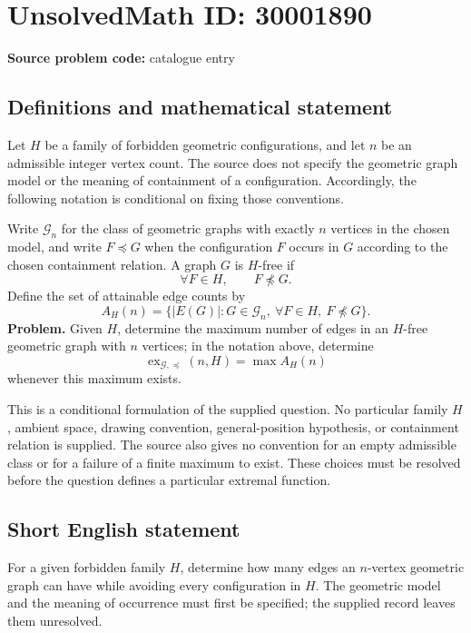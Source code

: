 \documentclass[11pt]{article}
\begin{document}
\section*{UnsolvedMath ID: 30001890}
\textbf{Source problem code:} catalogue entry
\subsection{Definitions and mathematical statement}
Let \(H\) be a family of forbidden geometric configurations, and let \(n\) be an admissible integer vertex count. The source does not specify the geometric graph model or the meaning of containment of a configuration. Accordingly, the following notation is conditional on fixing those conventions.

Write \(\mathcal G_n\) for the class of geometric graphs with exactly \(n\) vertices in the chosen model, and write \(F\preccurlyeq G\) when the configuration \(F\) occurs in \(G\) according to the chosen containment relation. A graph \(G\) is \(H\)-free if
\[
\forall F\in H,\qquad F\not\preccurlyeq G.
\]
Define the set of attainable edge counts by
\[
A_H(n)=\bigl\{|E(G)|:G\in\mathcal G_n,\ \forall F\in H,\ F\not\preccurlyeq G\bigr\}.
\]
\textbf{Problem.} Given \(H\), determine the maximum number of edges in an \(H\)-free geometric graph with \(n\) vertices; in the notation above, determine
\[
\operatorname{ex}_{\mathcal G,\preccurlyeq}(n,H)=\max A_H(n)
\]
whenever this maximum exists.

This is a conditional formulation of the supplied question. No particular family \(H\), ambient space, drawing convention, general-position hypothesis, or containment relation is supplied. The source also gives no convention for an empty admissible class or for a failure of a finite maximum to exist. These choices must be resolved before the question defines a particular extremal function.
\subsection{Short English statement}
For a given forbidden family \(H\), determine how many edges an \(n\)-vertex geometric graph can have while avoiding every configuration in \(H\). The geometric model and the meaning of occurrence must first be specified; the supplied record leaves them unresolved.
\end{document}
